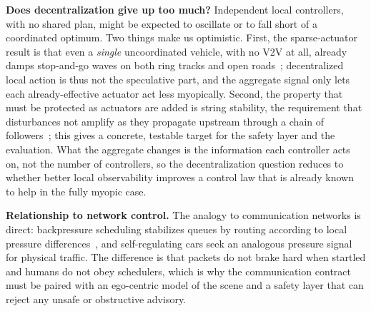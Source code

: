\noindent\textbf{Does decentralization give up too much?}
Independent local controllers, with no shared plan, might be expected to oscillate or to fall short of a coordinated optimum. Two things make us optimistic. First, the sparse-actuator result is that even a \emph{single} uncoordinated vehicle, with no V2V at all, already damps stop-and-go waves on both ring tracks and open roads~\cite{stern2018dissipation,lee2024traffic}; decentralized local action is thus not the speculative part, and the aggregate signal only lets each already-effective actuator act less myopically. Second, the property that must be protected as actuators are added is string stability, the requirement that disturbances not amplify as they propagate upstream through a chain of followers~\cite{swaroop1996string}; this gives a concrete, testable target for the safety layer and the evaluation. What the aggregate changes is the information each controller acts on, not the number of controllers, so the decentralization question reduces to whether better local observability improves a control law that is already known to help in the fully myopic case.

\noindent\textbf{Relationship to network control.}
The analogy to communication networks is direct: backpressure scheduling stabilizes queues by routing according to local pressure differences~\cite{tassiulas1990stability}, and self-regulating cars seek an analogous pressure signal for physical traffic. The difference is that packets do not brake hard when startled and humans do not obey schedulers, which is why the communication contract must be paired with an ego-centric model of the scene and a safety layer that can reject any unsafe or obstructive advisory.

